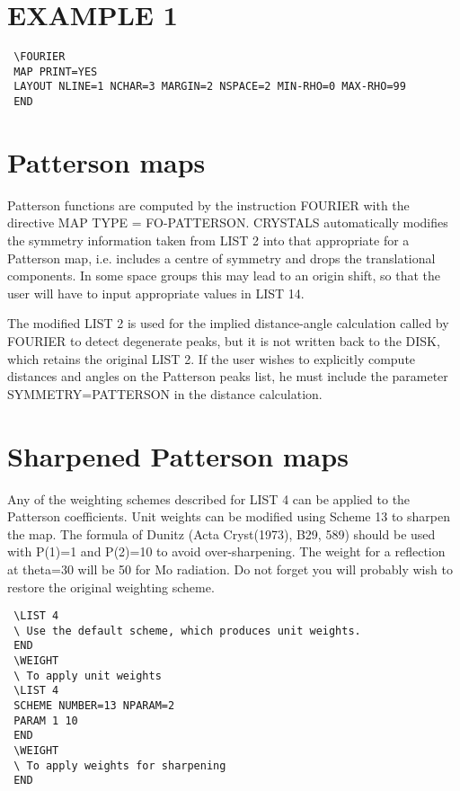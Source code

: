 \documentclass[10pt,a4paper]{report}
\begin{document}
\section{EXAMPLE 1}
\small\begin{verbatim}
 \FOURIER
 MAP PRINT=YES
 LAYOUT NLINE=1 NCHAR=3 MARGIN=2 NSPACE=2 MIN-RHO=0 MAX-RHO=99
 END
\end{verbatim}\normalsize


\section{Patterson maps}


Patterson functions are computed by the instruction FOURIER
 with the directive MAP TYPE = FO-PATTERSON.  CRYSTALS 
 automatically modifies the symmetry information taken from  LIST 2 
 into that appropriate for a Patterson map, i.e. includes a centre of symmetry
 and drops the translational components. In some space groups this may lead
 to an origin shift, so that the user will have to 
 input appropriate values in  LIST 14. 


The modified LIST 2 is used for the implied distance-angle calculation called
 by FOURIER to detect degenerate peaks, but it is not written back to the DISK,
 which retains the original LIST 2. If the user wishes to explicitly
 compute distances and angles on the Patterson peaks list, he must include
 the parameter SYMMETRY=PATTERSON in the distance calculation.
\section{Sharpened Patterson maps}





Any of the weighting schemes described for LIST 4 can be applied to
 the Patterson coefficients. Unit weights can be  modified using  Scheme 13
 to sharpen the map. The formula of Dunitz (Acta Cryst(1973), B29, 589) 
 should be used with P(1)=1 and P(2)=10 to avoid over-sharpening. The weight
 for a reflection at theta=30 will be 50 for Mo radiation. Do not forget
 you will probably wish to restore the original weighting scheme.

\small\begin{verbatim}
 \LIST 4
 \ Use the default scheme, which produces unit weights.
 END
 \WEIGHT
 \ To apply unit weights
 \LIST 4
 SCHEME NUMBER=13 NPARAM=2
 PARAM 1 10
 END
 \WEIGHT
 \ To apply weights for sharpening
 END
\end{verbatim}\normalsize
\end{document}
